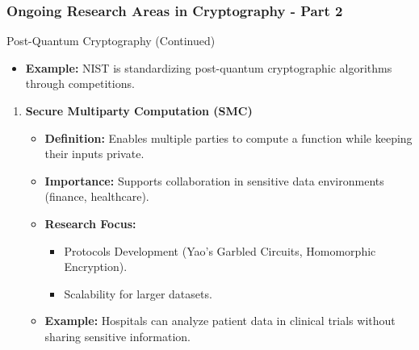 \documentclass{beamer}
\begin{document}
\begin{frame}[fragile]
    \frametitle{Ongoing Research Areas in Cryptography - Part 2}
    \begin{block}{Post-Quantum Cryptography (Continued)}
        \begin{itemize}
            \item \textbf{Example:} NIST is standardizing post-quantum cryptographic algorithms through competitions.
        \end{itemize}
        \begin{enumerate}
            \item \textbf{Secure Multiparty Computation (SMC)}
            \begin{itemize}
                \item \textbf{Definition:} Enables multiple parties to compute a function while keeping their inputs private.
                \item \textbf{Importance:} Supports collaboration in sensitive data environments (finance, healthcare).
                \item \textbf{Research Focus:}
                \begin{itemize}
                    \item Protocols Development (Yao's Garbled Circuits, Homomorphic Encryption).
                    \item Scalability for larger datasets.
                \end{itemize}
                \item \textbf{Example:} Hospitals can analyze patient data in clinical trials without sharing sensitive information.
            \end{itemize}
        \end{enumerate}
    \end{block}
\end{frame}
\end{document}
